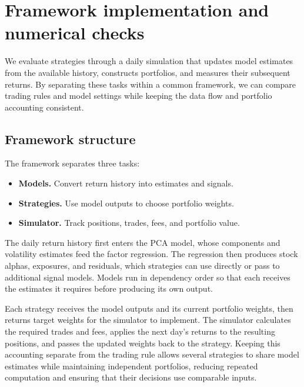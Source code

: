 \documentclass[11pt,letterpaper]{article}
\begin{document}

\section{Framework implementation and numerical checks}
\label{app:framework}

We evaluate strategies through a daily simulation that updates model
estimates from the available history, constructs portfolios, and measures
their subsequent returns. By separating these tasks within a common
framework, we can compare trading rules and model settings while keeping
the data flow and portfolio accounting consistent.

\subsection{Framework structure}

The framework separates three tasks:
\begin{itemize}
    \item \textbf{Models.} Convert return history into estimates and signals.
    \item \textbf{Strategies.} Use model outputs to choose portfolio weights.
    \item \textbf{Simulator.} Track positions, trades, fees, and portfolio value.
\end{itemize}
The daily return history first enters the PCA model, whose components
and volatility estimates feed the factor regression. The regression then
produces stock alphas, exposures, and residuals, which strategies can use
directly or pass to additional signal models.
Models run in dependency order so that each receives the estimates it
requires before producing its own output.

Each strategy receives the model outputs and its current portfolio
weights, then returns target weights for the simulator to implement.
The simulator calculates the required trades and fees, applies the next
day's returns to the resulting positions, and passes the updated weights
back to the strategy. Keeping this accounting separate from the trading
rule allows several strategies to share model estimates while maintaining
independent portfolios, reducing repeated computation and ensuring that
their decisions use comparable inputs.
\end{document}

